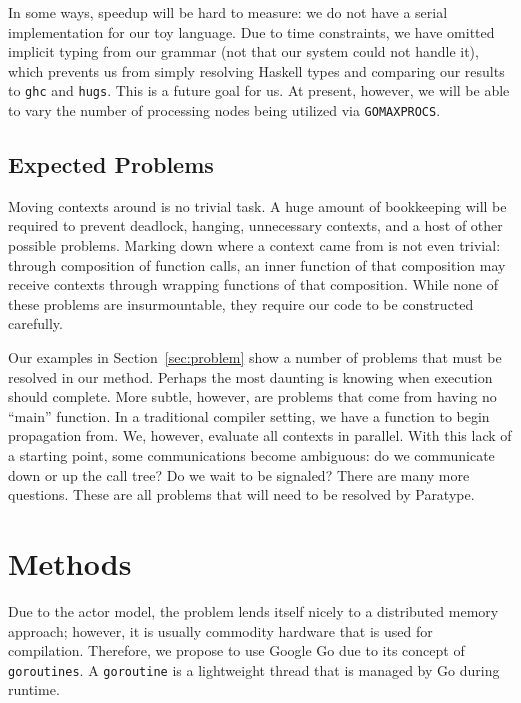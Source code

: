 \documentclass{acm_proc_article-sp}
\begin{document}
In some ways, speedup will be hard to measure: we do not have a serial
implementation for our toy language. Due to time constraints, we
have omitted implicit typing from our grammar (not that our system
could not handle it), which prevents us from simply resolving Haskell
types and comparing our results to \texttt{ghc} and
\texttt{hugs}. This is a future goal for us. At present, however,
we will be able to vary the number of processing nodes being
utilized via \texttt{GOMAXPROCS}.

\subsection{Expected Problems}

Moving contexts around is no trivial task. A huge amount of
bookkeeping will be required to prevent deadlock, hanging, unnecessary
contexts, and a host of other possible problems. Marking down where a
context came from is not even trivial: through composition of
function calls, an inner function of that composition may receive
contexts through wrapping functions of that composition. While none of
these problems are insurmountable, they require our code to be
constructed carefully.

Our examples in Section~\ref{sec:problem} show a number of problems that must be
resolved in our method. Perhaps the most daunting is knowing when
execution should complete. More subtle, however, are problems that
come from having no ``main'' function. In a traditional compiler
setting, we have a function to begin propagation from. We, however,
evaluate all contexts in parallel. With this lack of a starting point,
some communications become ambiguous: do we communicate down or up
the call tree? Do we wait to be signaled? There are many more questions. These
are all problems that will need to be resolved by Paratype.

\section{Methods}


Due to the actor model, the problem lends itself nicely to a distributed memory
approach; however, it is usually commodity hardware that is used for
compilation. Therefore, we propose to use Google Go due to its concept of
\texttt{goroutines}. A \texttt{goroutine} is a lightweight thread that is
managed by Go during runtime.
\end{document}
